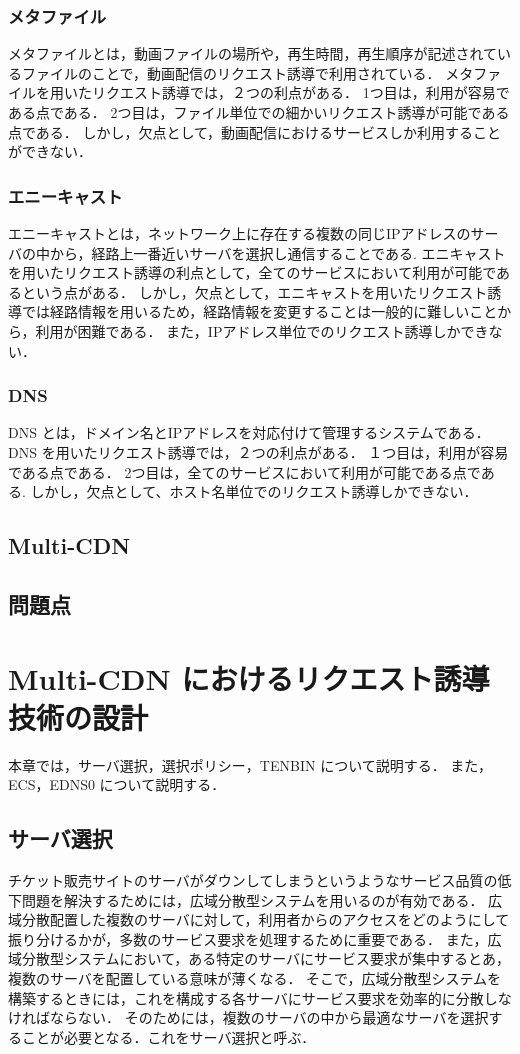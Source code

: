 \documentclass[a4j,12pt,onecolumn,oneside,titlepage,openany,final]{jreport}
\begin{document}
\subsection{メタファイル}
メタファイルとは，動画ファイルの場所や，再生時間，再生順序が記述されているファイルのことで，動画配信のリクエスト誘導で利用されている．
メタファイルを用いたリクエスト誘導では，２つの利点がある．
1つ目は，利用が容易である点である．
2つ目は，ファイル単位での細かいリクエスト誘導が可能である点である．
しかし，欠点として，動画配信におけるサービスしか利用することができない．
\subsection{エニーキャスト}
エニーキャストとは，ネットワーク上に存在する複数の同じIPアドレスのサーバの中から，経路上一番近いサーバを選択し通信することである.
エニキャストを用いたリクエスト誘導の利点として，全てのサービスにおいて利用が可能であるという点がある．
しかし，欠点として，エニキャストを用いたリクエスト誘導では経路情報を用いるため，経路情報を変更することは一般的に難しいことから，利用が困難である．
また，IPアドレス単位でのリクエスト誘導しかできない．
\subsection{DNS}
DNS とは，ドメイン名とIPアドレスを対応付けて管理するシステムである．
DNS を用いたリクエスト誘導では，２つの利点がある．
１つ目は，利用が容易である点である．
2つ目は，全てのサービスにおいて利用が可能である点である.
しかし，欠点として、ホスト名単位でのリクエスト誘導しかできない．
\section{Multi-CDN}
\section{問題点}

 
\chapter{Multi-CDN におけるリクエスト誘導技術の設計}\label{chap:Design}
本章では，サーバ選択，選択ポリシー，TENBIN について説明する．
また，ECS，EDNS0 について説明する．
\section{サーバ選択}\label{server_select}
チケット販売サイトのサーバがダウンしてしまうというようなサービス品質の低下問題を解決するためには，広域分散型システムを用いるのが有効である．
広域分散配置した複数のサーバに対して，利用者からのアクセスをどのようにして振り分けるかが，多数のサービス要求を処理するために重要である．
また，広域分散型システムにおいて，ある特定のサーバにサービス要求が集中するとあ，複数のサーバを配置している意味が薄くなる．
そこで，広域分散型システムを構築するときには，これを構成する各サーバにサービス要求を効率的に分散しなければならない．
そのためには，複数のサーバの中から最適なサーバを選択することが必要となる．これをサーバ選択と呼ぶ．
\end{document}
